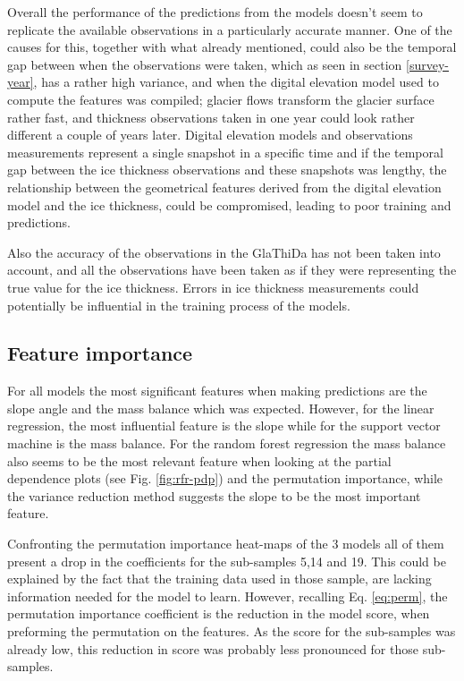 Overall the performance of the predictions from the models doesn't seem to replicate the available observations in a particularly accurate manner. One of the causes for this, together with what already mentioned, could also be the temporal gap between when the observations were taken, which as seen in section \ref{survey-year}, has a rather high variance, and when the digital elevation model used to compute the features was compiled; glacier flows transform the glacier surface rather fast, and thickness observations taken in one year could look rather different a couple of years later. Digital elevation models and observations measurements represent a single snapshot in a specific time and if the temporal gap between the ice thickness observations and these snapshots was lengthy, the relationship between the geometrical features derived from the digital elevation model and the ice thickness, could be compromised, leading to poor training and predictions.

Also the accuracy of the observations in the GlaThiDa has not been taken into account, and all the observations have been taken as if they were representing the true value for the ice thickness. Errors in ice thickness measurements could potentially be influential in the training process of the models. 

\subsection{Feature importance}\label{disc-features}
For all models the most significant features when making predictions are the slope angle and the mass balance which was expected. However, for the linear regression, the most influential feature is the slope while for the support  vector machine is the mass balance. For the random forest regression the mass balance also seems to be the most relevant feature when looking at the partial dependence plots (see Fig. \ref{fig:rfr-pdp}) and the permutation importance, while the variance reduction method suggests the slope to be the most important feature.

Confronting the permutation importance heat-maps of the 3 models all of them present a drop in the coefficients for the sub-samples 5,14 and 19. This could be explained by the fact that the training data used in those sample, are lacking information needed for the model to learn. However, recalling Eq. \ref{eq:perm}, the permutation importance coefficient is the reduction in the model score, when preforming the permutation on the features. As the score for the sub-samples was already low, this reduction in score was probably less pronounced for those sub-samples. 

